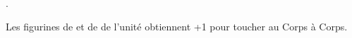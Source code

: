 \endpricelist

\armymagicalbanners

\startpricelist

 . 

 Les figurines de \barrowknights{} et de \barrowguards{}  de l'unité obtiennent +1 pour toucher au Corps à Corps.

\endpricelist

\closearmymagicalitems








\quickrefsheettitle


\bigskip
\begin{center}\end{center}

\newcommand{\QRSinvoctable}[2]{%
\rowcolors{1}{white}{black!10}
\noindent\begin{tabular}{p{4cm}>{\centering\let\newline\\\arraybackslash\hspace{0pt}}p{1cm}@{}}%
\antiquefont\Large{\textbf{#1\spacebeforecolon{}:}}&\vspace*{-0.2cm}%
\DTLforeach*[#2]{profiles}{\rowname=name, \rowtrooptype=trooptype, \rowcategory=category, \rowinvocation=invocation}{%
\tabularnewline\rowname{} & \rowinvocation{}}%
\tabularnewline%
\end{tabular}
\medskip
}

